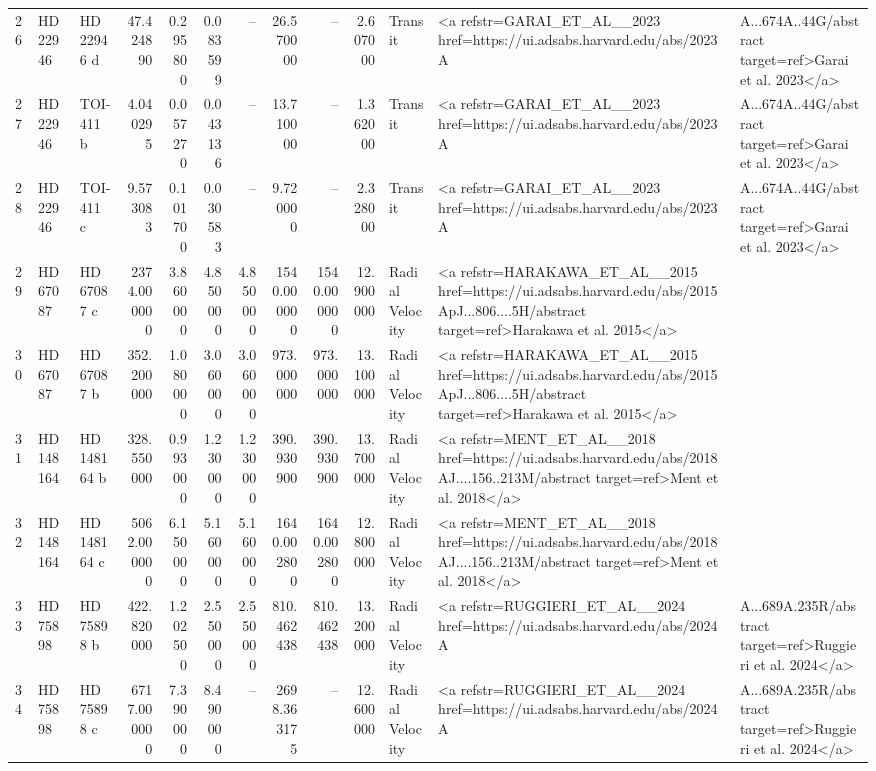 \begin{tabular}{lllrrrrrrrll}
26 & HD 22946 & HD 22946 d & 47.424890 & 0.295800 & 0.083599 & -- & 26.570000 & -- & 2.607000 & Transit & <a refstr=GARAI_ET_AL__2023 href=https://ui.adsabs.harvard.edu/abs/2023A&A...674A..44G/abstract target=ref>Garai et al. 2023</a> \\
27 & HD 22946 & TOI-411 b & 4.040295 & 0.057270 & 0.043136 & -- & 13.710000 & -- & 1.362000 & Transit & <a refstr=GARAI_ET_AL__2023 href=https://ui.adsabs.harvard.edu/abs/2023A&A...674A..44G/abstract target=ref>Garai et al. 2023</a> \\
28 & HD 22946 & TOI-411 c & 9.573083 & 0.101700 & 0.030583 & -- & 9.720000 & -- & 2.328000 & Transit & <a refstr=GARAI_ET_AL__2023 href=https://ui.adsabs.harvard.edu/abs/2023A&A...674A..44G/abstract target=ref>Garai et al. 2023</a> \\
29 & HD 67087 & HD 67087 c & 2374.000000 & 3.860000 & 4.850000 & 4.850000 & 1540.000000 & 1540.000000 & 12.900000 & Radial Velocity & <a refstr=HARAKAWA_ET_AL__2015 href=https://ui.adsabs.harvard.edu/abs/2015ApJ...806....5H/abstract target=ref>Harakawa et al. 2015</a> \\
30 & HD 67087 & HD 67087 b & 352.200000 & 1.080000 & 3.060000 & 3.060000 & 973.000000 & 973.000000 & 13.100000 & Radial Velocity & <a refstr=HARAKAWA_ET_AL__2015 href=https://ui.adsabs.harvard.edu/abs/2015ApJ...806....5H/abstract target=ref>Harakawa et al. 2015</a> \\
31 & HD 148164 & HD 148164 b & 328.550000 & 0.993000 & 1.230000 & 1.230000 & 390.930900 & 390.930900 & 13.700000 & Radial Velocity & <a refstr=MENT_ET_AL__2018 href=https://ui.adsabs.harvard.edu/abs/2018AJ....156..213M/abstract target=ref>Ment et al. 2018</a> \\
32 & HD 148164 & HD 148164 c & 5062.000000 & 6.150000 & 5.160000 & 5.160000 & 1640.002800 & 1640.002800 & 12.800000 & Radial Velocity & <a refstr=MENT_ET_AL__2018 href=https://ui.adsabs.harvard.edu/abs/2018AJ....156..213M/abstract target=ref>Ment et al. 2018</a> \\
33 & HD 75898 & HD 75898 b & 422.820000 & 1.202500 & 2.550000 & 2.550000 & 810.462438 & 810.462438 & 13.200000 & Radial Velocity & <a refstr=RUGGIERI_ET_AL__2024 href=https://ui.adsabs.harvard.edu/abs/2024A&A...689A.235R/abstract target=ref>Ruggieri et al. 2024</a> \\
34 & HD 75898 & HD 75898 c & 6717.000000 & 7.390000 & 8.490000 & -- & 2698.363175 & -- & 12.600000 & Radial Velocity & <a refstr=RUGGIERI_ET_AL__2024 href=https://ui.adsabs.harvard.edu/abs/2024A&A...689A.235R/abstract target=ref>Ruggieri et al. 2024</a> \\

\end{tabular}
